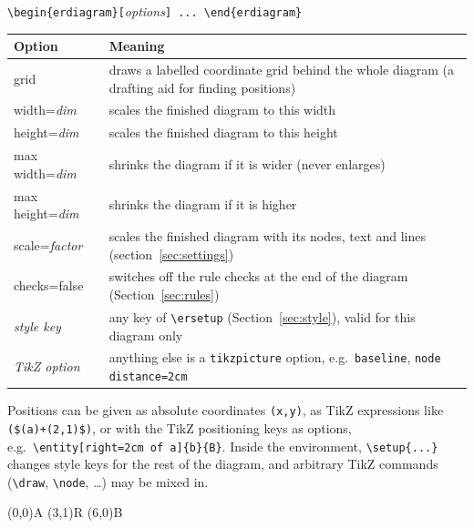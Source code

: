 \documentclass[10pt,a4paper]{article}
\newcommand\cs[1]{\texttt{\textbackslash#1}}
\newcommand\meta[1]{\textlangle\textit{#1}\textrangle}
\begin{document}
\begin{center}
\verb|\begin{erdiagram}[|\meta{options}\verb|] ... \end{erdiagram}|
\end{center}

\begin{longtable}{@{}>{\ttfamily}p{3.3cm}p{12.5cm}@{}}
\toprule
\normalfont\textbf{Option} & \textbf{Meaning}\\\midrule
grid & draws a labelled coordinate grid behind the whole diagram (a
  drafting aid for finding positions)\\
width=\meta{dim} & scales the finished diagram to this width\\
height=\meta{dim} & scales the finished diagram to this height\\
max width=\meta{dim} & shrinks the diagram if it is wider (never enlarges)\\
max height=\meta{dim} & shrinks the diagram if it is higher\\
scale=\meta{factor} & scales the finished diagram with its nodes, text and lines
  (section~\ref{sec:settings})\\
checks=false & switches off the rule checks at the end of the diagram
  (Section~\ref{sec:rules})\\
\meta{style key} & any key of \cs{ersetup} (Section~\ref{sec:style}),
  valid for this diagram only\\
\meta{TikZ option} & anything else is a \texttt{tikzpicture} option,
  e.g.\ \texttt{baseline}, \texttt{node distance=2cm}\\
\bottomrule
\end{longtable}

Positions can be given as absolute coordinates \verb|(x,y)|, as TikZ
expressions like \verb|($(a)+(2,1)$)|, or with the TikZ positioning keys
as options, e.g.\ \verb|\entity[right=2cm of a]{b}{B}|. Inside the
environment, \cs{setup}\verb|{...}| changes style keys for the rest of
the diagram, and arbitrary TikZ commands (\cs{draw}, \cs{node}, \dots)
may be mixed in.

\begin{example}
\begin{erdiagram}[grid, scale=0.8,
                  card placement=beside]
  (0,0){A}
  (3,1){R}
  (6,0){B}
\end{erdiagram}
\end{example}
\end{document}
